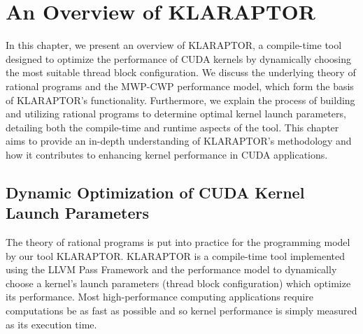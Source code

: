 \chapter{An Overview of KLARAPTOR}
\label{ch:overview}

In this chapter, we present an overview of KLARAPTOR, a compile-time tool designed to optimize the performance of 
CUDA kernels by dynamically choosing the most suitable thread block configuration. We discuss the underlying theory 
of rational programs and the MWP-CWP performance model, which form the basis of KLARAPTOR's functionality. Furthermore, 
we explain the process of building and utilizing rational programs to determine optimal kernel launch parameters, 
detailing both the compile-time and runtime aspects of the tool. This chapter aims to provide an in-depth understanding of 
KLARAPTOR's methodology and how it contributes to enhancing kernel performance in CUDA applications.

\section{Dynamic Optimization of CUDA Kernel Launch Parameters}
\label{sec:klaraptor}


The theory of rational programs is put into practice for the {\cuda}
programming model by our tool KLARAPTOR.  KLARAPTOR is a compile-time
tool implemented using the LLVM Pass Framework and the {\mwpcwp}
performance model to dynamically choose a {\cuda} kernel's launch
parameters (thread block configuration) which optimize its
performance.  Most high-performance computing applications require
computations be as fast as possible and so kernel performance is
simply measured as its execution time.

